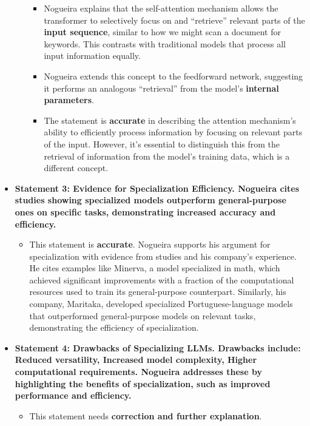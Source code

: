 \documentclass[
]{article}
\begin{document}
\begin{itemize}
\begin{itemize}
\begin{itemize}
    \item
      Nogueira explains that the self-attention mechanism allows the
      transformer to selectively focus on and ``retrieve'' relevant
      parts of the \textbf{input sequence}, similar to how we might scan
      a document for keywords. This contrasts with traditional models
      that process all input information equally.
    \item
      Nogueira extends this concept to the feedforward network,
      suggesting it performs an analogous ``retrieval'' from the model's
      \textbf{internal parameters}.
    \item
      The statement is \textbf{accurate} in describing the attention
      mechanism's ability to efficiently process information by focusing
      on relevant parts of the input. However, it's essential to
      distinguish this from the retrieval of information from the
      model's training data, which is a different concept.
    \end{itemize}
  \end{itemize}
\item
  \textbf{Statement 3: Evidence for Specialization Efficiency. Nogueira
  cites studies showing specialized models outperform general-purpose
  ones on specific tasks, demonstrating increased accuracy and
  efficiency.}

  \begin{itemize}
  
  \item
    This statement is \textbf{accurate}. Nogueira supports his argument
    for specialization with evidence from studies and his company's
    experience. He cites examples like Minerva, a model specialized in
    math, which achieved significant improvements with a fraction of the
    computational resources used to train its general-purpose
    counterpart. Similarly, his company, Maritaka, developed specialized
    Portuguese-language models that outperformed general-purpose models
    on relevant tasks, demonstrating the efficiency of specialization.
  \end{itemize}
\item
  \textbf{Statement 4: Drawbacks of Specializing LLMs. Drawbacks
  include: Reduced versatility, Increased model complexity, Higher
  computational requirements. Nogueira addresses these by highlighting
  the benefits of specialization, such as improved performance and
  efficiency.}

  \begin{itemize}
  \item
    This statement needs \textbf{correction and further explanation}.


\end{itemize}
\end{itemize}
\end{document}
